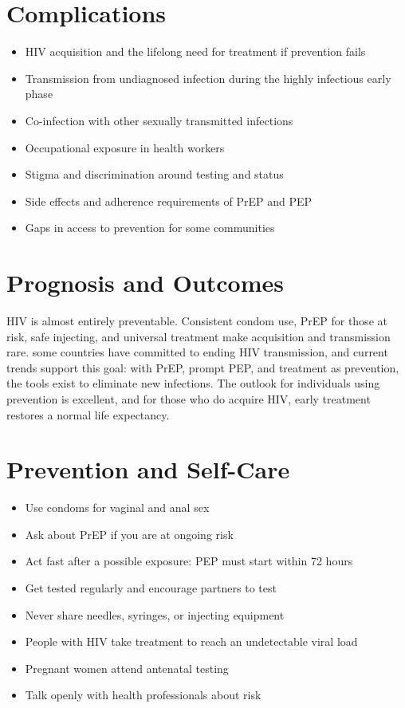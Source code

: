 \section*{Complications}
\begin{itemize}
    \item HIV acquisition and the lifelong need for treatment if prevention fails
    \item Transmission from undiagnosed infection during the highly infectious early phase
    \item Co-infection with other sexually transmitted infections
    \item Occupational exposure in health workers
    \item Stigma and discrimination around testing and status
    \item Side effects and adherence requirements of PrEP and PEP
    \item Gaps in access to prevention for some communities
\end{itemize}

\section*{Prognosis and Outcomes}
HIV is almost entirely preventable. Consistent condom use, PrEP for those at risk, safe injecting, and universal treatment make acquisition and transmission rare. some countries have committed to ending HIV transmission, and current trends support this goal: with PrEP, prompt PEP, and treatment as prevention, the tools exist to eliminate new infections. The outlook for individuals using prevention is excellent, and for those who do acquire HIV, early treatment restores a normal life expectancy.

\section*{Prevention and Self-Care}
\begin{itemize}
    \item Use condoms for vaginal and anal sex
    \item Ask about PrEP if you are at ongoing risk
    \item Act fast after a possible exposure: PEP must start within 72 hours
    \item Get tested regularly and encourage partners to test
    \item Never share needles, syringes, or injecting equipment
    \item People with HIV take treatment to reach an undetectable viral load
    \item Pregnant women attend antenatal testing
    \item Talk openly with health professionals about risk
\end{itemize}

